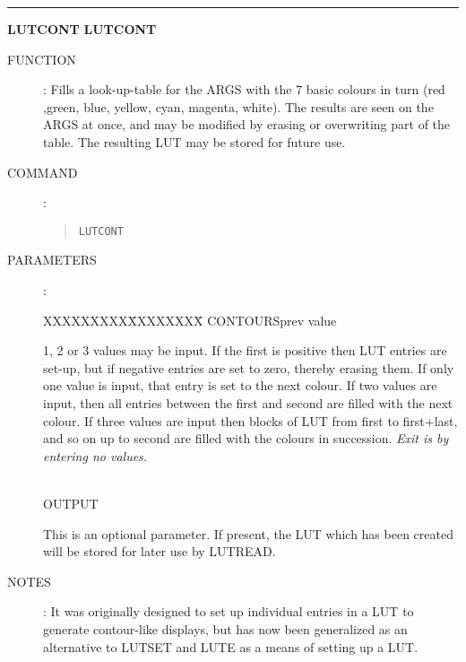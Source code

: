\goodbreak
\rule{\textwidth}{0.3mm}
{\Large {\bf LUTCONT} \hfill {\bf LUTCONT}}
\begin{description}
\item [FUNCTION]:
Fills a look-up-table for the ARGS with the 7 basic colours in turn
(red ,green, blue, yellow, cyan, magenta, white).
The results are seen on the ARGS at once, and may be modified by erasing or
overwriting part of the table.
The resulting LUT may be stored for future use.
\item [COMMAND]:
\begin{quote}
{\tt LUTCONT}
\end{quote}
\item [PARAMETERS] :
\begin{tabbing}
XXXXXXXXX\=XXXXXXXX\=\kill
CONTOURS\>prev value\>\begin{minipage}[t]{100mm}
1, 2 or 3 values may be input.
If the first is positive then LUT entries are set-up, but if negative entries
are set to zero, thereby erasing them.
If only one value is input, that entry is set to the next colour.
If two values are input, then all entries between the first and second are
filled with the next colour.
If three values are input then blocks of LUT from first to first+last, and so on
up to second are filled with the colours in succession.
{\em Exit is by entering no values.}
\end{minipage}\\
OUTPUT\>\>\begin{minipage}[t]{100mm}
This is an optional parameter.
If present, the LUT which has been created will be stored for later use by
LUTREAD.
\end{minipage}
\end{tabbing}
\item [NOTES]:
It was originally designed to set up individual entries in a LUT to generate
contour-like displays, but has now been generalized as an alternative to
LUTSET and LUTE as a means of setting up a LUT.
\end{description}

